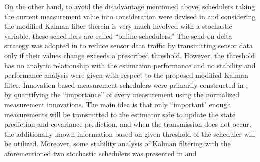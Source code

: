 \documentclass[journal]{IEEEtran}
\begin{document}
 On the other hand, to avoid the disadvantage mentioned above, schedulers taking the current measurement value into consideration were devised in \cite{tsp2012you,auto2007suh,auto2012battistelli,tsp2013you,tac2013shi} and considering the modified Kalman filter therein is very much involved with a stochastic variable, these schedulers are called ``online schedulers.'' The send-on-delta strategy was adopted in \cite{auto2007suh} to reduce sensor data traffic by transmitting sensor data only if their values change exceeds a prescribed threshold. However, the threshold has no analytic relationship with the estimation performance and no stability and performance analysis were given with respect to the proposed modified Kalman filter. Innovation-based measurement schedulers were primarily constructed in \cite{tsp2012you}, \cite{tac2013shi} by quantifying the ``importance'' of every measurement using the normalized measurement innovations. The main idea is that only ``important" enough measurements will be transmitted to the estimator side to update the state prediction and covariance prediction, and when the transmission does not occur, the additionally known information based on given threshold of the scheduler will be utilized. Moreover, some stability analysis of Kalman filtering with the aforementioned two stochastic schedulers was presented in \cite{tsp2012you} and {\color{black}{however, only necessary conditions guaranteeing the convergence of expected estimation error covariance were established for systems with full-row-ranked observation matrix therein.}}
\end{document}
